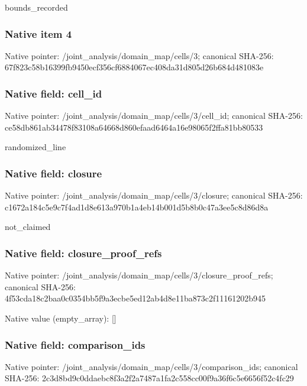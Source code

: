 \documentclass[10pt,a4paper]{article}
\begin{document}
\begingroup\raggedright\sloppy bounds\_\allowbreak{}recorded\par\endgroup

\subsubsection{Native item 4}
Native pointer: /joint\_\allowbreak{}analysis/domain\_\allowbreak{}map/cells/3; canonical SHA-256: 67f823c58b16399fb9450ecf356cf6884067ec408da31d805d26b684d481083e

\subsubsection{Native field: cell\_\allowbreak{}id}
Native pointer: /joint\_\allowbreak{}analysis/domain\_\allowbreak{}map/cells/3/cell\_\allowbreak{}id; canonical SHA-256: ce58db861ab34478f83108a64668d860efaad6464a16e98065f2ffa81bb80533

\begingroup\raggedright\sloppy randomized\_\allowbreak{}line\par\endgroup

\subsubsection{Native field: closure}
Native pointer: /joint\_\allowbreak{}analysis/domain\_\allowbreak{}map/cells/3/closure; canonical SHA-256: c1672a184c5e9c7f4ad1d8e613a970b1a4eb14b001d5b8b0c47a3ee5c8d86d8a

\begingroup\raggedright\sloppy not\_\allowbreak{}claimed\par\endgroup

\subsubsection{Native field: closure\_\allowbreak{}proof\_\allowbreak{}refs}
Native pointer: /joint\_\allowbreak{}analysis/domain\_\allowbreak{}map/cells/3/closure\_\allowbreak{}proof\_\allowbreak{}refs; canonical SHA-256: 4f53cda18c2baa0c0354bb5f9a3ecbe5ed12ab4d8e11ba873c2f11161202b945

Native value (empty\_\allowbreak{}array): []

\subsubsection{Native field: comparison\_\allowbreak{}ids}
Native pointer: /joint\_\allowbreak{}analysis/domain\_\allowbreak{}map/cells/3/comparison\_\allowbreak{}ids; canonical SHA-256: 2c3d8bd9c0ddaebc8f3a2f2a7487a1fa2c558cc00f9a36f6c5e6656f52c4fc29
\end{document}
